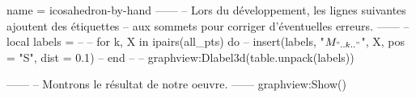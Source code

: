 \documentclass{standalone}
\begin{document}
\begin{luadraw}{name = icosahedron-by-hand}
------
-- Lors du développement, les lignes suivantes ajoutent des étiquettes
-- aux sommets pour corriger d'éventuelles erreurs.
------
-- local labels = {}
--
-- for k, X in ipairs(all_pts) do
--   insert(labels, {"$M_{".. k .."}$", X, {pos = "S", dist = 0.1}})
-- end
--
-- graphview:Dlabel3d(table.unpack(labels))

------
-- Montrons le résultat de notre oeuvre.
------
graphview:Show()
\end{luadraw}
\end{document}
